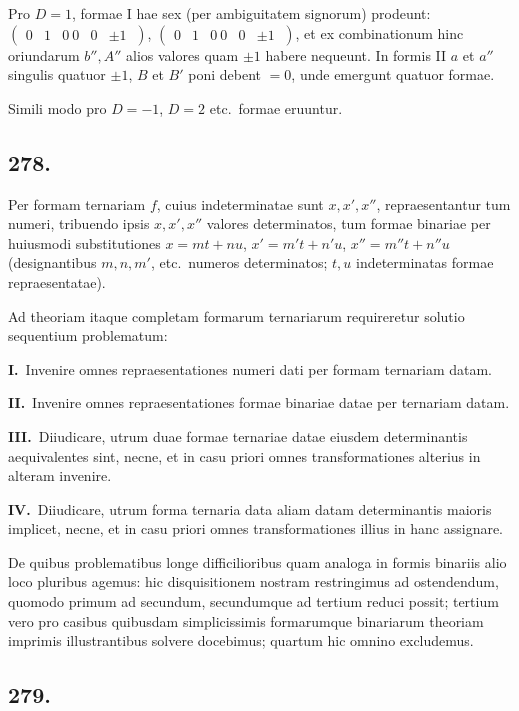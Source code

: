 \documentclass[12pt,a4paper]{article}
\theoremstyle{plain}
\theoremstyle{definition}
\theoremstyle{remark}
\begin{document}
Pro $D = 1$, formae I hae sex (per ambiguitatem signorum) prodeunt: $\begin{pmatrix} 0 & 1 & 0 \ 0 & 0 & \pm 1 \ \end{pmatrix}$, $\begin{pmatrix} 0 & 1 & 0 \ 0 & 0 & \pm 1 \ \end{pmatrix}$, et ex combinationum hinc oriundarum $b'', A''$ alios valores quam $\pm 1$ habere nequeunt. In formis II $a$ et $a''$ singulis quatuor $\pm 1$, $B$ et $B'$ poni debent $= 0$, unde emergunt quatuor formae.

Simili modo pro $D = -1$, $D = 2$ etc.\ formae eruuntur.

\subsection*{278.}

Per formam ternariam $f$, cuius indeterminatae sunt $x, x', x''$, repraesentantur tum numeri, tribuendo ipsis $x, x', x''$ valores determinatos, tum formae binariae per huiusmodi substitutiones $x = mt + nu$, $x' = m't + n'u$, $x'' = m''t + n''u$ (designantibus $m, n, m'$, etc.\ numeros determinatos; $t, u$ indeterminatas formae repraesentatae).

Ad theoriam itaque completam formarum ternariarum requireretur solutio sequentium problematum:

\textbf{I.}\ Invenire omnes repraesentationes numeri dati per formam ternariam datam.

\textbf{II.}\ Invenire omnes repraesentationes formae binariae datae per ternariam datam.

\textbf{III.}\ Diiudicare, utrum duae formae ternariae datae eiusdem determinantis aequivalentes sint, necne, et in casu priori omnes transformationes alterius in alteram invenire.

\textbf{IV.}\ Diiudicare, utrum forma ternaria data aliam datam determinantis maioris implicet, necne, et in casu priori omnes transformationes illius in hanc assignare.

De quibus problematibus longe difficilioribus quam analoga in formis binariis alio loco pluribus agemus: hic disquisitionem nostram restringimus ad ostendendum, quomodo primum ad secundum, secundumque ad tertium reduci possit; tertium vero pro casibus quibusdam simplicissimis formarumque binariarum theoriam imprimis illustrantibus solvere docebimus; quartum hic omnino excludemus.

\subsection*{279.}
\end{document}
